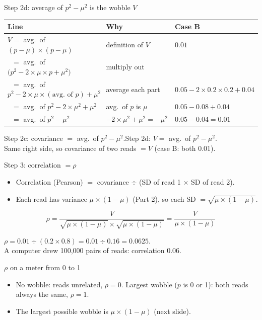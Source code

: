 \documentclass[aspectratio=169,11pt]{beamer}
\begin{document}
\begin{frame}{Step 2d: average of $p^2 - \mu^2$ is the wobble $V$}
\small
\renewcommand{\arraystretch}{1.1}\setlength{\tabcolsep}{3pt}
\begin{tabular}{@{}l l l@{}}
\toprule
\textbf{Line} & \textbf{Why} & \textbf{Case B}\\
\midrule
$V = $ avg.\ of $(p - \mu) \times (p - \mu)$ & definition of $V$ & $0.01$\\
$\phantom{V} = $ avg.\ of $\bigl(p^2 - 2 \times \mu \times p + \mu^2\bigr)$ & multiply out & \\
$\phantom{V} = $ avg.\ of $p^2 - 2 \times \mu \times (\text{avg.\ of } p) + \mu^2$ & average each part & $0.05 - 2 \times 0.2 \times 0.2 + 0.04$\\
$\phantom{V} = $ avg.\ of $p^2 - 2 \times \mu^2 + \mu^2$ & avg.\ of $p$ is $\mu$ & $0.05 - 0.08 + 0.04$\\
$\phantom{V} = $ avg.\ of $p^2 - \mu^2$ & $-2\times\mu^2 + \mu^2 = -\mu^2$ & $0.05 - 0.04 = 0.01$\\
\bottomrule
\end{tabular}
\medskip
\begin{remember}
Step 2c: covariance $=$ avg.\ of $p^2 - \mu^2$.\quad Step 2d: $V = $ avg.\
of $p^2 - \mu^2$.\\
Same right side, so \alert{covariance of two reads $= V$} (case B: both
0.01).
\end{remember}
\end{frame}

\begin{frame}{Step 3: correlation $= \rho$}
\begin{itemize}
\item Correlation (Pearson) $=$ covariance $\div$ (SD of read 1 $\times$ SD
  of read 2).
\item Each read has variance $\mu \times (1-\mu)$ (Part 2), so each SD $=
  \sqrt{\mu \times (1-\mu)}$.
\end{itemize}
\[
\rho = \frac{V}{\sqrt{\mu \times (1-\mu)} \times \sqrt{\mu \times (1-\mu)}}
 = \frac{V}{\mu \times (1-\mu)}
\]
\begin{worked}[ case B]
$\rho = 0.01 \div (0.2 \times 0.8) = 0.01 \div 0.16 = 0.0625$.\\
A computer drew 100{,}000 pairs of reads: correlation 0.06.
\end{worked}
\end{frame}


\begin{frame}{$\rho$ on a meter from 0 to 1}
\begin{center}
\resizebox{!}{0.5\textheight}{}
\end{center}
\begin{itemize}\small
\item No wobble: reads unrelated, $\rho = 0$. Largest wobble ($p$ is 0 or 1):
  both reads always the same, $\rho = 1$.
\item The largest possible wobble is $\mu \times (1-\mu)$ (next slide).
\end{itemize}
\end{frame}
\end{document}
